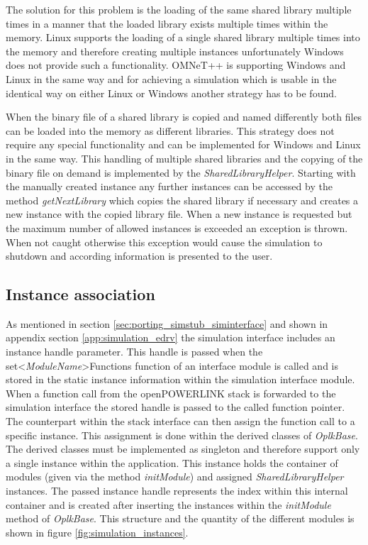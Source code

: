 The solution for this problem is the loading of the same shared library multiple times in a manner that the loaded library exists multiple times within the memory.
Linux supports the loading of a single shared library multiple times into the memory and therefore creating multiple instances unfortunately Windows does not provide such a functionality.
OMNeT++ is supporting Windows and Linux in the same way and for achieving a simulation which is usable in the identical way on either Linux or Windows another strategy has to be found.

When the binary file of a shared library is copied and named differently both files can be loaded into the memory as different libraries.
This strategy does not require any special functionality and can be implemented for Windows and Linux in the same way.
This handling of multiple shared libraries and the copying of the binary file on demand is implemented by the \emph{SharedLibraryHelper}.
Starting with the manually created instance any further instances can be accessed by the method \emph{getNextLibrary} which copies the shared library if necessary and creates a new instance with the copied library file.
When a new instance is requested but the maximum number of allowed instances is exceeded an exception is thrown.
When not caught otherwise this exception would cause the simulation to shutdown and according information is presented to the user.


\subsection{Instance association}
\label{sec:porting_stack_instance_assoc}
As mentioned in section \ref{sec:porting_simstub_siminterface} and shown in appendix section \ref{app:simulation_edrv} the simulation interface includes an instance handle parameter.
This handle is passed when the set<\emph{ModuleName}>Functions function of an interface module is called and is stored in the static instance information within the simulation interface module.
When a function call from the openPOWERLINK stack is forwarded to the simulation interface the stored handle is passed to the called function pointer.
The counterpart within the stack interface can then assign the function call to a specific instance.
This assignment is done within the derived classes of \emph{OplkBase}.
The derived classes must be implemented as singleton and therefore support only a single instance within the application.
This instance holds the container of modules (given via the method \emph{initModule}) and assigned \emph{SharedLibraryHelper} instances.
The passed instance handle represents the index within this internal container and is created after inserting the instances within the \emph{initModule} method of \emph{OplkBase}.
This structure and the quantity of the different modules is shown in figure \ref{fig:simulation_instances}.

